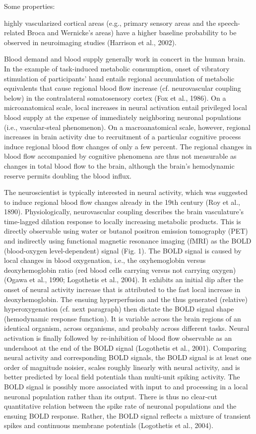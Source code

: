 \documentclass[authoryear,review,3p]{elsarticle}
\begin{document}
Some properties:

highly vascularized cortical areas (e.g., primary sensory areas and the speech-related Broca and Wernicke's areas) have a higher baseline probability to be observed in neuroimaging studies (Harrison et al., 2002).

Blood demand and blood supply generally work in concert in the human brain. In the example of task-induced metabolic consumption, onset of vibratory stimulation of participants' hand entails regional accumulation of metabolic equivalents that cause regional blood flow increase (cf. neurovascular coupling below) in the contralateral somatosensory cortex (Fox et al., 1986). On a microanatomical scale, local increases in neural activation entail privileged local blood supply at the expense of immediately neighboring neuronal populations (i.e., vascular-steal phenomenon). On a macroanatomical scale, however, regional increases in brain activity due to recruitment of a particular cognitive process induce regional blood flow changes of only a few percent. The regional changes in blood flow accompanied by cognitive phenomena are thus not measurable as changes in total blood flow to the brain, although the brain's hemodynamic reserve permits doubling the blood influx.

The neuroscientist is typically interested in neural activity, which was suggested to induce regional blood flow changes already in the 19th century (Roy et al., 1890). Physiologically, neurovascular coupling describes the brain vasculature's time-lagged dilation response to locally increasing metabolic products. This is directly observable using water or butanol positron emission tomography (PET) and indirectly using functional magnetic resonance imaging (fMRI) as the BOLD (blood-oxygen level-dependent) signal (Fig. 1). The BOLD signal is caused by local changes in blood oxygenation, i.e., the oxyhemoglobin versus deoxyhemoglobin ratio (red blood cells carrying versus not carrying oxygen) (Ogawa et al., 1990; Logothetis et al., 2004). It exhibits an initial dip after the onset of neural activity increase that is attributed to the fast local increase in deoxyhemoglobin. The ensuing hyperperfusion and the thus generated (relative) hyperoxygenation (cf. next paragraph) then dictate the BOLD signal shape (hemodynamic response function). It is variable across the brain regions of an identical organism, across organisms, and probably across different tasks. Neural activation is finally followed by re-inhibition of blood flow observable as an undershoot at the end of the BOLD signal (Logothetis et al., 2001).
Comparing neural activity and corresponding BOLD signals, the BOLD signal is at least one order of magnitude noisier, scales roughly linearly with neural activity, and is better predicted by local field potentials than multi-unit spiking activity. The BOLD signal is possibly more associated with input to and processing in a local neuronal population rather than its output. There is thus no clear-cut quantitative relation between the spike rate of neuronal populations and the ensuing BOLD response. Rather, the BOLD signal reflects a mixture of transient spikes and continuous membrane potentials (Logothetis et al., 2004).
\end{document}
